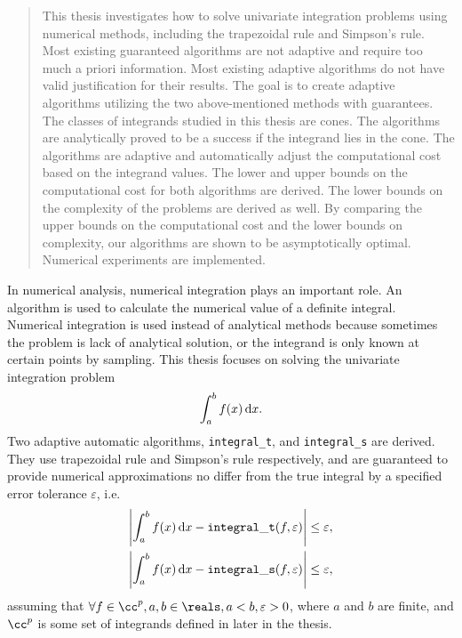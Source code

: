 \documentclass{iitthesis}
\theoremstyle{definition}
\theoremstyle{remark}
\begin{document}
\begin{abstract}           %
\par This thesis investigates how to solve univariate integration problems using numerical methods, including the trapezoidal rule and Simpson's rule. Most existing guaranteed algorithms are not adaptive and require too much a priori information. Most existing adaptive algorithms do not have valid justification for their results. The goal is to create adaptive algorithms utilizing the two above-mentioned methods with guarantees. The classes of integrands studied in this thesis are cones. The algorithms are analytically proved to be a success if the integrand lies in the cone. The algorithms are adaptive and automatically adjust the computational cost based on the integrand values. The lower and upper bounds on the computational cost for both algorithms are derived. The lower bounds on the complexity of the problems are derived as well. By comparing the upper bounds on the computational cost and the lower bounds on complexity, our algorithms are shown to be asymptotically optimal. Numerical experiments are implemented.
\end{abstract}


\textpages     %


In numerical analysis, numerical integration plays an important role. An algorithm is used to calculate the numerical value of a definite integral. Numerical integration is used instead of analytical methods because sometimes the problem is lack of analytical solution, or the integrand is only known at certain points by sampling. This thesis focuses on solving the univariate integration problem
\begin{equation}\label{integral}
    \int_{a}^{b}f(x)\,\textup{d}x.
\end{equation}
Two adaptive automatic algorithms, {\tt integral\_t}, and {\tt integral\_s} are derived. They use trapezoidal rule and Simpson's rule respectively, and are guaranteed to provide numerical approximations no differ from the true integral by a specified error tolerance $\varepsilon$, i.e.
\begin{align}\label{approx}
      \left|\int_{a}^{b}f(x)\,\textup{d}x-{\tt integral\_t}(f,\varepsilon)\right|\leq \varepsilon,& \\
      \left|\int_{a}^{b}f(x)\,\textup{d}x-{\tt integral\_s}(f,\varepsilon)\right|\leq \varepsilon,&
\end{align}
assuming that $\forall f \in \cc^{p}, a,b\in\reals, a<b, \varepsilon>0$, where $a$ and $b$ are finite, and $\cc^{p}$ is some set of integrands defined in later in the thesis.
\end{document}
